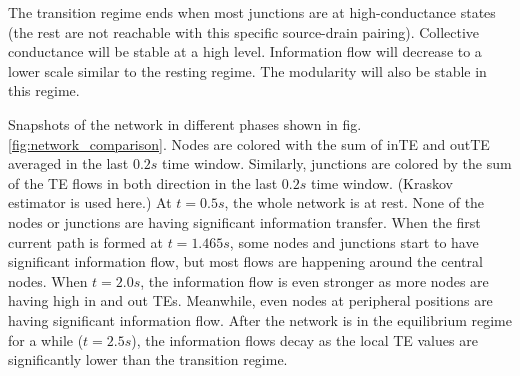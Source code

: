 \documentclass[%
 reprint,
 amsmath,amssymb,
 aps,
floatfix,
]{revtex4-2}
\begin{document}
The transition regime ends when most junctions are at high-conductance states (the rest are not reachable with this specific source-drain pairing). Collective conductance will be stable at a high level. Information flow will decrease to a lower scale similar to the resting regime. The modularity will also be stable in this regime.

Snapshots of the network in different phases shown in fig. \ref{fig:network_comparison}. Nodes are colored with the sum of inTE and outTE averaged in the last $0.2 s$ time window. Similarly, junctions are colored by the sum of the TE flows in both direction in the last $0.2 s$ time window. (Kraskov estimator is used here.) At $t= 0.5 s$, the whole network is at rest. None of the nodes or junctions are having significant information transfer. When the first current path is formed at $t = 1.465 s$, some nodes and junctions start to have significant information flow, but most flows are happening around the central nodes. When $t = 2.0 s$, the information flow is even stronger as more nodes are having high in and out TEs. Meanwhile, even nodes at peripheral positions are having significant information flow. After the network is in the equilibrium regime for a while ($t = 2.5 s$), the information flows decay as the local TE values are significantly lower than the transition regime.
\end{document}

